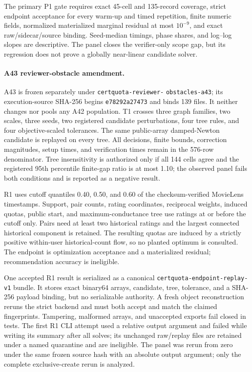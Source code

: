 The primary P1 gate requires exact 45-cell and 135-record coverage, strict
endpoint acceptance for every warm-up and timed repetition, finite numeric
fields, normalized materialized marginal residual at most $10^{-9}$, and exact
raw/sidecar/source binding.  Seed-median timings, phase shares, and log--log
slopes are descriptive.  The panel closes the verifier-only scope gap, but its
regression does not prove a globally near-linear candidate solver.

\paragraph{A43 reviewer-obstacle amendment.}
A43 is frozen separately under
\texttt{certquota-}\allowbreak\texttt{reviewer-}\allowbreak
\texttt{obstacles-a43}; its execution-source SHA-256 begins
\texttt{e78292a27473} and binds 139 files.  It neither changes nor pools any A42
population.  T1 crosses three graph families, two scales, three seeds, two
registered candidate perturbations, four tree rules, and four objective-scaled
tolerances.  The same public-array damped-Newton candidate is replayed on every
tree.  All decisions, finite bounds, correction magnitudes, setup times, and
verification times remain in the 576-row denominator.  Tree insensitivity is
authorized only if all 144 cells agree and the registered
95th percentile finite-gap ratio is at most 1.10; the observed panel fails both
conditions and is reported as a negative result.

R1 uses cutoff quantiles 0.40, 0.50, and 0.60 of the checksum-verified
MovieLens timestamps.  Support, pair counts, rating coordinates, reciprocal
weights, induced quotas, public start, and maximum-conductance tree use ratings
at or before the cutoff only.  Pairs need at least two historical ratings and
the largest connected historical component is retained.  The resulting quotas
are induced by a strictly positive within-user historical-count flow, so no
planted optimum is consulted.  The endpoint is optimization acceptance and a
materialized residual; recommendation accuracy is ineligible.

One accepted R1 result is serialized as a canonical
\texttt{certquota-endpoint-replay-v1} bundle.  It stores exact binary64 arrays,
candidate, tree, tolerance, and a SHA-256 payload binding, but no serializable
authority.  A fresh object reconstruction reruns the strict backend and must
both accept and match the claimed fingerprints.  Tampering, malformed arrays,
and unaccepted exports fail closed in tests.  The first R1 CLI attempt used a
relative output argument and failed while writing its summary after all solves;
its unchanged raw/replay files are retained under a named quarantine and are
ineligible.  The panel was rerun from zero under the same frozen source hash
with an absolute output argument; only the complete exclusive-create rerun is
analyzed.

